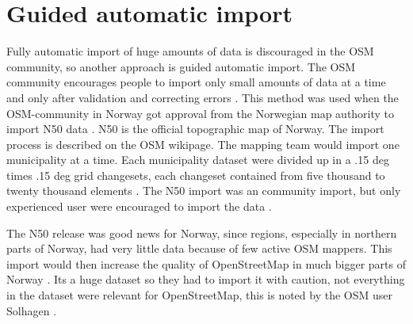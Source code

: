 
\section{Guided automatic import}\label{guidedautoimp}
Fully automatic import of huge amounts of data is discouraged in the OSM community, so another approach is guided automatic import. The OSM community encourages people to import only small amounts of data at a time and only after validation and correcting errors \cite{Mehus2014}. This method was used when the OSM-community in Norway got approval from the Norwegian map authority to import N50 data \cite{Kihle2014}. N50 is the official topographic map of Norway. The import process is described on the OSM wikipage. The mapping team would import one municipality at a time. Each municipality dataset were divided up in a .15 deg times .15 deg grid changesets, each changeset contained from five thousand to twenty thousand elements \cite{OSMN502014}. The N50 import was an community import, but only experienced user were encouraged to import the data \cite{Mehus2014}. 

The N50 release was good news for Norway, since regions, especially in northern parts of Norway, had very little data because of few active OSM mappers. This import would then increase the quality of OpenStreetMap in much bigger parts of Norway \cite{Jorgenrud2013}. Its a huge dataset so they had to import it with caution, not everything in the dataset were relevant for OpenStreetMap, this is noted by the OSM user Solhagen \cite{Solhagen2015}. %

